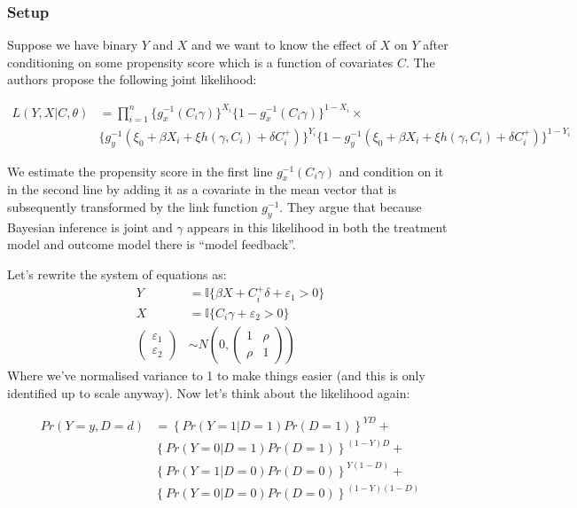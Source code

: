 \documentclass{article}
\begin{document}
  
\subsubsection*{Setup}
Suppose we have binary $Y$ and $X$ and we want to know the effect of $X$ on $Y$ 
after conditioning on some propensity score which is a function of covariates 
$C$. The authors propose the following joint likelihood:

\begin{align*}
    L(Y, X | C, \theta) &= \prod^n_{i = 1} \{
        g_x^{-1}(C_i \gamma)\}^{X_i} \{
            1 - g_x^{-1}(C_i\gamma)\}^{1 - X_i} \times \\
            &\{
                g_y^{-1}(\xi_0 + \beta X_i + \xi h(\gamma, C_i) + \delta C^+_i)
                \}^{Y_i} 
                \{1 -
                g_y^{-1}(\xi_0 + \beta X_i + \xi h(\gamma, C_i) + \delta C^+_i)
                \}^{1 - Y_i} 
\end{align*}

We estimate the propensity score in the first line $g_x^{-1}(C_i\gamma)$ and 
condition on it in the second line by adding it as a covariate in the mean vector 
that is subsequently transformed by the link function $g_y^{-1}$.
They argue that because Bayesian inference is joint and $\gamma$ appears in this likelihood in both the treatment 
model and outcome model there is ``model feedback''.


Let's rewrite the system of equations as:
\begin{align*}
    Y &= \mathbb{I}\{\beta X +  C_i^+ \delta + \varepsilon_1 > 0\} \\
    X &= \mathbb{I}\{ C_i\gamma + \varepsilon_2 > 0 \} \\
    \begin{pmatrix}
        \varepsilon_1 \\
        \varepsilon_2
    \end{pmatrix} &\sim N\left(0, \begin{pmatrix}
        1 & \rho \\
        \rho & 1
    \end{pmatrix}\right)
\end{align*}
Where we've normalised variance to 1 to make things easier (and this is only 
identified up to scale anyway). Now let's think about the likelihood again:

\begin{align*}
    Pr(Y = y, D = d) &= \left\{
        Pr(Y = 1 | D = 1) Pr(D = 1)
    \right\}^{YD} + \\
&\left\{
        Pr(Y = 0 | D = 1) Pr(D = 1)
    \right\}^{(1 -Y)D} + \\
&\left\{
        Pr(Y = 1 | D = 0) Pr(D = 0)
    \right\}^{Y(1 - D)} + \\
&\left\{
        Pr(Y = 0 | D = 0) Pr(D = 0)
    \right\}^{(1 -Y)(1 - D)} 
\end{align*}
\end{document}

